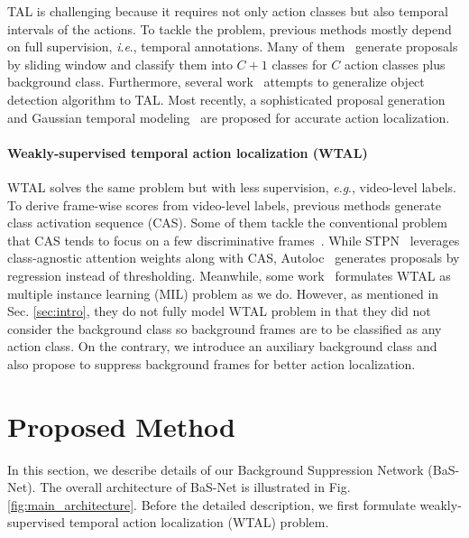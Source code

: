 \documentclass[letterpaper]{article} %
\newcommand{\ie}{\textit{i}.\textit{e}.}
\newcommand{\eg}{\textit{e}.\textit{g}.}
\newcommand{\Fref}[1]{Fig. \ref{#1}}
\newcommand{\Sref}[1]{Sec. \ref{#1}}
\begin{document}
TAL is challenging because it requires not only action classes but also temporal intervals of the actions. To tackle the problem, previous methods mostly depend on full supervision, \ie, temporal annotations. Many of them~\cite{shou2016temporal,yuan2016temporal} generate proposals by sliding window and classify them into $C+1$ classes for $C$ action classes plus background class. Furthermore, several work~\cite{xu2017r,chao2018rethinking} attempts to generalize object detection algorithm to TAL. Most recently, a sophisticated proposal generation~\cite{lin2018bsn} and Gaussian temporal modeling~\cite{long2019gaussian} are proposed for accurate action localization.

\paragraph{Weakly-supervised temporal action localization (WTAL)}

WTAL solves the same problem but with less supervision, \eg, video-level labels. To derive frame-wise scores from video-level labels, previous methods generate class activation sequence (CAS). Some of them tackle the conventional problem that CAS tends to focus on a few discriminative frames~\cite{singh2017hide,Yuan2019MARGINALIZEDAA,liu2019completeness}.
While STPN~\cite{nguyen2018weakly} leverages class-agnostic attention weights along with CAS, Autoloc~\cite{shou2018autoloc} generates proposals by regression instead of thresholding.
Meanwhile, some work~\cite{wang2017untrimmednets,paul2018w,Xu2019SegregatedTA} formulates WTAL as multiple instance learning (MIL) problem
as we do.
However, as mentioned in \Sref{sec:intro}, they do not fully model WTAL problem in that they did not consider the background class so background frames are to be classified as any action class.
On the contrary, we introduce an auxiliary background class and also propose to suppress background frames for better action localization.

\section{Proposed Method}
\label{sec:proposed_method}

In this section, we describe details of our Background Suppression Network (BaS-Net). The overall architecture of BaS-Net is illustrated in \Fref{fig:main_architecture}. Before the detailed description, we first formulate weakly-supervised temporal action localization (WTAL) problem.
\end{document}
